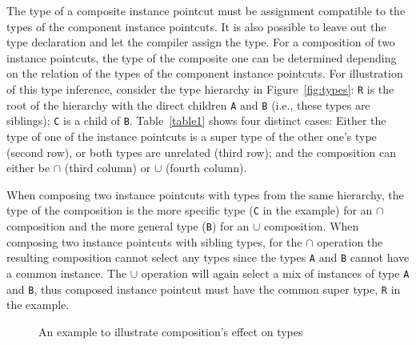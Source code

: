\documentclass{acm_proc_article-sp}
\newcommand{\lstinln}[1]{\lstinline~#1~}
\begin{document}
The type of a composite instance pointcut must be assignment compatible to the types of the component instance pointcuts. It is also possible to leave out the type declaration and let the compiler assign the type.  For a composition of two instance pointcuts, the type of the composite one can be determined depending on the relation of the types of the component instance pointcuts. For illustration of this type inference, consider the type hierarchy in Figure~\ref{fig:types}: \lstinln{R} is the root of the hierarchy with the direct children \lstinln{A} and \lstinln{B} (i.e., these types are siblings); \lstinln{C} is a child of \lstinln{B}. Table~\ref{table1} shows four distinct cases: Either the type of one of the instance pointcuts is a super type of the other one's type (second row), or both types are unrelated (third row); and the composition can either be $\cap$ (third column) or $\cup$ (fourth column).

When composing two instance pointcuts with types from the same hierarchy, the type of the composition is the more specific type (\lstinln{C} in the example) for an $\cap$ composition and the more general type (\lstinln{B}) for an $\cup$ composition.
When composing two instance pointcuts with sibling types, for the $\cap$ operation the resulting composition cannot select any types since the types \lstinln{A} and \lstinln{B} cannot have a common instance. The $\cup$ operation will again select a mix of instances of type \lstinln{A} and \lstinln{B}, thus composed instance pointcut must have the common super type, \lstinln{R} in the example. 


\begin{figure}%
\centering
{}
\hspace{40pt}
\vspace{10pt}
\caption{An example to illustrate composition's effect on types}
\label{fig:compotypes}
\end{figure}
\end{document}
